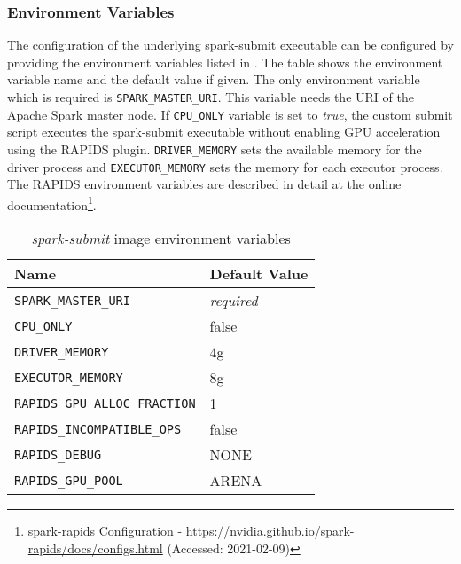\subsubsection{Environment Variables}
The configuration of the underlying spark-submit executable can be configured by providing the environment variables listed in . The table shows the environment variable name and the default value if given.
The only environment variable which is required is \texttt{SPARK\_MASTER\_URI}. This variable needs the URI of the Apache Spark master node.
If \texttt{CPU\_ONLY} variable is set to \textit{true}, the custom submit script executes the spark-submit executable without enabling GPU acceleration using the RAPIDS plugin.
\texttt{DRIVER\_MEMORY} sets the available memory for the driver process and \texttt{EXECUTOR\_MEMORY} sets the memory for each executor process.
The RAPIDS environment variables are described in detail at the online documentation\footnote{spark-rapids Configuration - \url{https://nvidia.github.io/spark-rapids/docs/configs.html} (Accessed: 2021-02-09)}.
\begin{table}[]
\centering
\begin{tabular}{@{}ll@{}}
\toprule
Name                                                   & Default Value     \\ \midrule
\texttt{SPARK\_MASTER\_URI}           & \textit{required} \\
\texttt{CPU\_ONLY}           & false \\
\texttt{DRIVER\_MEMORY}               & 4g                \\
\texttt{EXECUTOR\_MEMORY}             & 8g                \\
\texttt{RAPIDS\_GPU\_ALLOC\_FRACTION} & 1                 \\
\texttt{RAPIDS\_INCOMPATIBLE\_OPS}    & false             \\
\texttt{RAPIDS\_DEBUG}                & NONE              \\
\texttt{RAPIDS\_GPU\_POOL}            & ARENA             \\ \bottomrule
\end{tabular}
\caption{\textit{spark-submit} image environment variables}
\label{table:06_env_depl_submit-envs}
\end{table}


